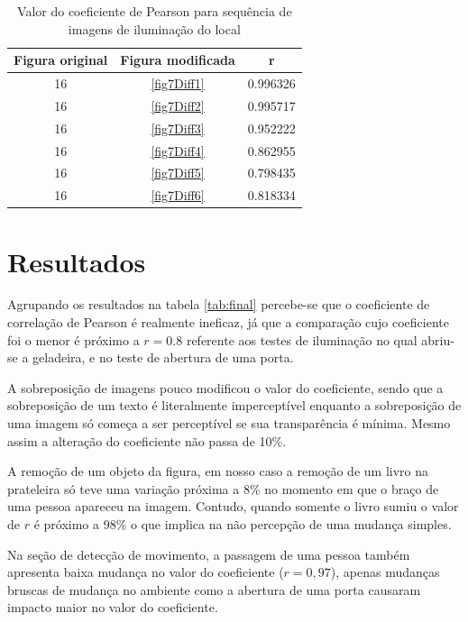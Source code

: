 \documentclass[10pt,a4paper]{article}
\begin{document}
\begin{table}[h!]
  \begin{center}
    \caption{Valor do coeficiente de Pearson para sequência de imagens
      de iluminação do local}
    \begin{tabular}{|c|c|c|}
      \hline
      Figura original & Figura modificada & r\\
      \hline
      16 &  \ref{fig7Diff1} & 0.996326\\
      16 &  \ref{fig7Diff2} & 0.995717\\
      16 &  \ref{fig7Diff3} & 0.952222\\
      16 &  \ref{fig7Diff4} & 0.862955\\
      16 &  \ref{fig7Diff5} & 0.798435\\
      16 &  \ref{fig7Diff6} &  0.818334\\
      \hline
    \end{tabular}
  \end{center}
\end{table}
\newpage
\section{Resultados}
Agrupando os resultados na tabela \ref{tab:final} percebe-se que o
coeficiente de correlação de Pearson é realmente ineficaz, já que a
comparação cujo coeficiente foi o menor é próximo a $r=0.8$ referente
aos testes de iluminação no qual abriu-se a geladeira, e no teste de
abertura de uma porta.

A sobreposição de imagens pouco modificou o valor do coeficiente,
sendo que a sobreposição de um texto é literalmente imperceptível
enquanto a sobreposição de uma imagem só começa a ser perceptível se
sua transparência é mínima. Mesmo assim a alteração do coeficiente não
passa de 10\%.

A remoção de um objeto da figura, em nosso caso a remoção de um livro
na prateleira só teve uma variação próxima a 8\% no momento em que o
braço de uma pessoa apareceu na imagem. Contudo, quando somente o
livro sumiu o valor de $r$ é próximo a 98\% o que implica na não
percepção de uma mudança simples.

Na seção de detecção de movimento, a passagem de uma pessoa também
apresenta baixa mudança no valor do coeficiente ($r=0,97$), apenas
mudanças bruscas de mudança no ambiente como a abertura de uma porta
causaram impacto maior no valor do coeficiente.
\end{document}
